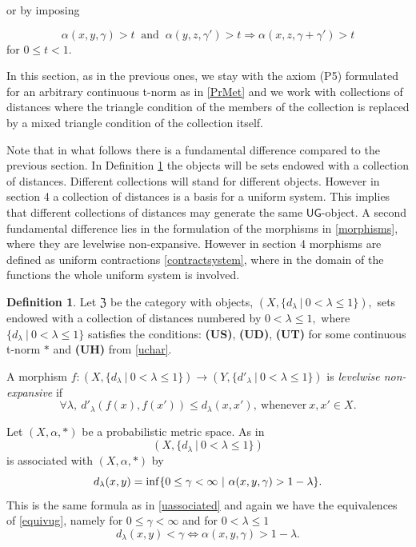 \documentclass[12pt,a4paper]{amsart}
\theoremstyle{theorem}
\theoremstyle{definition}
\newtheorem{definition}[theorem]{Definition}
\newcommand{\zz}{\ensuremath{\mathfrak{Z}}}
\newcommand{\ug}{\ensuremath{\mathsf{UG}}}
\renewcommand{\inf}{\myinf}
\DeclareMathOperator*{\myinf}{in\vphantom{p}f}
\renewcommand{\a}{\ensuremath{\alpha}}
\renewcommand{\l}{\ensuremath{\lambda}}
\def\rw{\rightarrow}
\begin{document}
{or by imposing 

$$
\a(x,y,\gamma) > t\ \text{ and } \ \a(y,z, \gamma' )> t  \Rightarrow \a(x,z, \gamma + \gamma') >t
$$
for $0 \leq t < 1.$

In this section, as in the previous ones, we stay with the axiom (P5) formulated for an arbitrary continuous t-norm as in \eqref{PrMet} and we work with collections of distances where the triangle condition of the members of the collection is replaced by a mixed triangle condition of the 
collection itself. 

Note that in what follows there is a fundamental difference compared to the previous section. In Definition \ref{Z} the objects will be sets endowed with a collection of distances. Different collections will stand for different objects. However in section 4 a collection of distances is a basis for a uniform system. This implies that different collections of distances may generate the same $\ug$-object. A second fundamental difference lies in the formulation of the morphisms in \eqref{morphisms}, where they are levelwise non-expansive. However in section 4 morphisms are defined as uniform contractions \eqref{contractsystem}, where in the domain of the functions the whole uniform system is involved.

\begin{definition}\label{Z}
Let $\zz$ be the category with objects, $(X, \{d_\l \ | \ 0< \l \leq 1\}),$ sets endowed with a collection of distances numbered by $ 0< \l \leq 1,$ where\\ $\{d_\l \ | \ 0< \l \leq 1\}$
satisfies the conditions: {\bf(US)}, {\bf(UD)}, {\bf(UT)}  for some continuous t-norm $*$  and {\bf(UH)} from \ref{uchar}.


A morphism  $f : (X, \{d_\l \ | \ 0< \l \leq 1\}) \rw (Y, \{d'_\l \ | \ 0< \l \leq 1\})$ is \emph{levelwise non-expansive} if
\begin{equation}\label{morphisms}
\forall \l, \  d'_\l(f(x), f(x')) \leq d_\l (x,x'), \ \text{whenever} \ x, x' \in X.
\end{equation}
\end{definition}

\vspace{.7cm}

Let $(X,\a,*)$ be a probabilistic metric space. As in \cite{N}
\begin{equation}\label{distanceassociated}
(X, \{ d_\l \ | \ 0 < \l \leq 1 \})  
\end{equation}
 is associated with $(X,\a,*)$ by
$$  d_\l(x,y) = \inf \{ 0 \leq \gamma < \infty \ | \ \a(x,y,\gamma) > 1 - \l \}.$$
This is the same formula as in \eqref{uassociated} and again we have the equivalences of \eqref{equivug}, namely 
for $0 \leq \gamma < \infty$ and for $0 < \l \leq 1$ 
 \begin{equation}\label{isoequiv}
d_\l (x,y) < \gamma \Leftrightarrow \a(x,y,\gamma) > 1-\l.
\end{equation}


}
\end{document}
